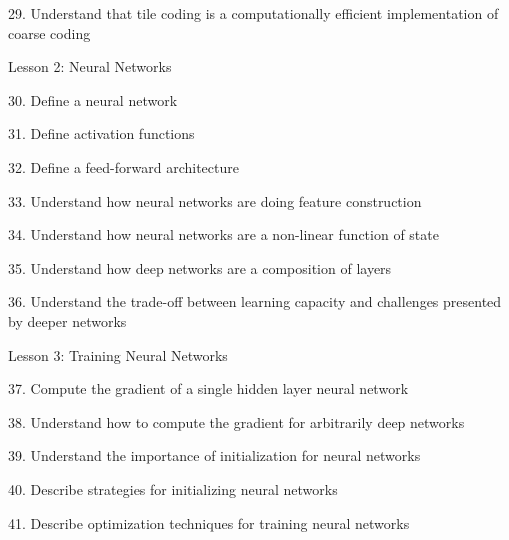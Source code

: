 \documentclass[sutton_barto_notes.tex]{subfiles}
\begin{document}
29. Understand that tile coding is a computationally efficient implementation of coarse coding 

Lesson 2: Neural Networks 

30. Define a neural network

31. Define activation functions

32. Define a feed-forward architecture 

33. Understand how neural networks are doing feature construction 

34. Understand how neural networks are a non-linear function of state 

35. Understand how deep networks are a composition of layers 

36. Understand the trade-off between learning capacity and challenges presented by deeper networks 

Lesson 3: Training Neural Networks 

37. Compute the gradient of a single hidden layer neural network 

38. Understand how to compute the gradient for arbitrarily deep networks 

39. Understand the importance of initialization for neural networks 

40. Describe strategies for initializing neural networks 

41. Describe optimization techniques for training neural networks
\end{document}
